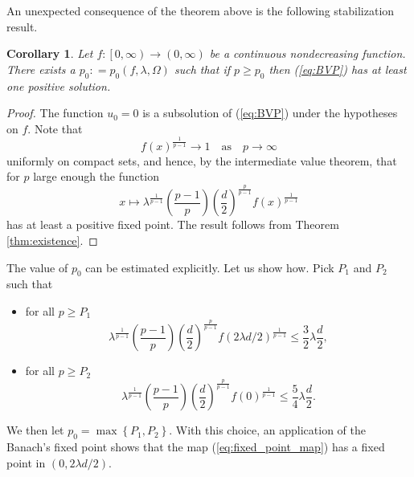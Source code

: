 \documentclass[11pt]{amsart}
\newtheorem{corollary}[theorem]{Corollary}
\theoremstyle{definition}
\begin{document}
An unexpected consequence of the theorem above is the following
stabilization result.
\begin{corollary}
\label{cor:existence}
    Let $f:\left[0,\infty\right)\longrightarrow \left(0,\infty\right)$ be a continuous nondecreasing function.
    There exists a $p_0\colon = p_0\left(f,\lambda,\Omega\right)$ such that
    if $p\geq p_0$ then (\ref{eq:BVP}) has at least 
    one positive solution.
\end{corollary}
\begin{proof}
    The function $u_0=0$ is a subsolution of (\ref{eq:BVP}) under
    the hypotheses on $f$. Note that 
    \[
    f\left(x\right)^{\frac{1}{p-1}}\rightarrow 1 \quad 
    \mbox{as}\quad p\rightarrow\infty
    \]
    uniformly on compact sets, 
    and hence, by the intermediate value theorem, that for $p$ large enough the function
    \[
    x\mapsto \lambda^{\frac{1}{p-1}}  \left(\frac{p-1}{p}\right)
\left(\frac{d}{2}\right)^{\frac{p}{p-1}}f\left(x\right)^{\frac{1}{p-1}}
    \]
    has at least a positive fixed point. The result follows from
    Theorem \ref{thm:existence}.
\end{proof}

The value of $p_0$ can be estimated explicitly. Let us show how.
Pick $P_1$ and $P_2$ such that 
\begin{itemize}
\item for all $p\geq P_1$
\[
\lambda^{\frac{1}{p-1}}\left(\frac{p-1}{p}\right)
\left(\frac{d}{2}\right)^{\frac{p}{p-1}}f\left(2\lambda d/2\right)^{\frac{1}{p-1}}\leq \frac{3}{2}\lambda 
\frac{d}{2},
\]
\item for all $p\geq P_2$
\[
\lambda^{\frac{1}{p-1}}\left(\frac{p-1}{p}\right)
\left(\frac{d}{2}\right)^{\frac{p}{p-1}} f\left(0\right)^{\frac{1}{p-1}}\leq \frac{5}{4}\lambda \frac{d}{2}.
\]
\end{itemize}
We then let $p_0=\max\left\{P_1,P_2\right\}$. With this choice, an application of the Banach's fixed point shows that the map
(\ref{eq:fixed_point_map}) has a fixed point in $\left(0,2\lambda d/2\right)$. 
\end{document}
